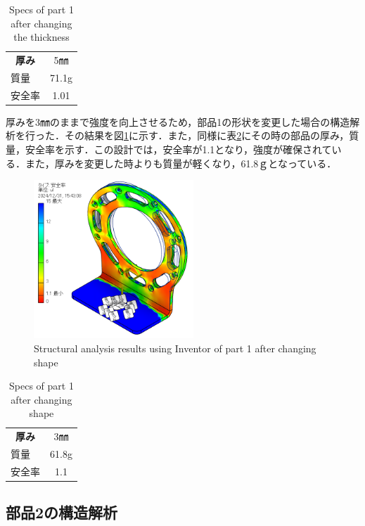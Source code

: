 \begin{table}[h]
  \centering
  \begin{tabular}{lc}
    \hline
    \multicolumn{1}{c}{\textbf{厚み}} & 5㎜    \\ 
    質量                               & 71.1g \\ 
    安全率                              & 1.01  \\ \hline
  \end{tabular}
  \caption{Specs of part 1 after changing the thickness}
  \label{tab:part1_spec_T5}
\end{table}
\clearpage
厚みを3㎜のままで強度を向上させるため，部品1の形状を変更した場合の構造解析を行った．その結果を図\ref{fig:T5}に示す．また，同様に表\ref{tab:part1_spec_T5}にその時の部品の厚み，質量，安全率を示す．この設計では，安全率が1.1となり，強度が確保されている．また，厚みを変更した時よりも質量が軽くなり，61.8ｇとなっている．
\begin{figure}[h]
  \centering
  \includegraphics[width=6cm]{images/design/T3_80.png}
  \caption{Structural analysis results using Inventor of part 1 after changing shape}
  \label{fig:T5}
\end{figure}
\begin{table}[h]
  \centering
  \begin{tabular}{lc}
    \hline
    \multicolumn{1}{c}{\textbf{厚み}} & 3㎜    \\ 
    質量                               & 61.8g \\ 
    安全率                              & 1.1  \\ \hline
  \end{tabular}
  \caption{Specs of part 1 after changing shape}
  \label{tab:part1_spec_T5}
\end{table}
\clearpage
\subsection{部品2の構造解析}
\newpage
